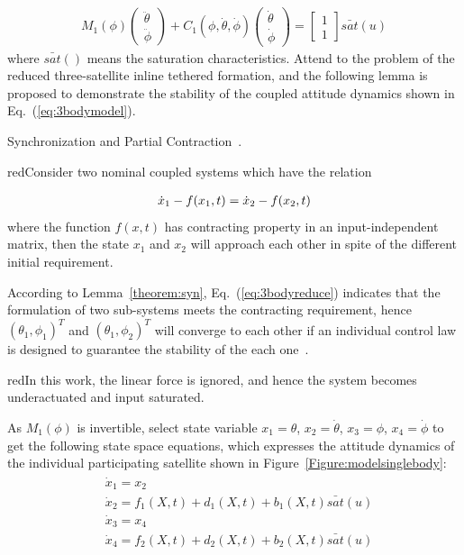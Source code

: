 \begin{align}
M_1(\phi)
\begin{pmatrix}
\ddot{\theta}\\
\ddot{\phi}
\end{pmatrix}
+C_1(\phi,\dot{\theta},\dot{\phi})
\begin{pmatrix}
\dot{\theta}\\
\dot{\phi}
\end{pmatrix}
=
\begin{bmatrix}
1\\
1
\end{bmatrix}\bar{sat}(u)\label{eq:individualsys}
\end{align}
where $\bar{sat}()$ means the saturation characteristics. Attend to the problem of the reduced three-satellite inline tethered formation, and the following lemma is proposed to demonstrate the stability of the coupled attitude dynamics shown in Eq.~(\ref{eq:3bodymodel}).
\begin{lemma}
Synchronization and Partial Contraction~\cite{wang2005partial}. \begin{color}{red}Consider two nominal coupled systems which have the relation\end{color}
\begin{align}
\dot{x}_1-f(x_1,t)=\dot{x}_2-f(x_2,t)\notag
\end{align}
where the function $f(x,t)$ has contracting property in an input-independent matrix, then the state $x_1$ and $x_2$ will approach each other in spite of the different initial requirement.\label{theorem:syn}
\end{lemma}\par
According to Lemma~\ref{theorem:syn}, Eq.~(\ref{eq:3bodyreduce}) indicates that the formulation of two sub-systems meets the contracting requirement, hence $(\theta_1,\phi_1)^T$ and $(\theta_1,\phi_2)^T$ will converge to each other if an individual control law is designed to guarantee the stability of the each one~\cite{huang2015nonlinear}.\par
\begin{color}{red}In this work, the linear force is ignored, and hence the system becomes underactuated and input saturated.\end{color}
As $M_1(\phi)$ is invertible, select state variable $x_1=\theta$, $x_2=\dot\theta$, $x_3=\phi$, $x_4=\dot\phi$ to get the following state space equations, which expresses the attitude dynamics of the individual participating satellite shown in Figure~\ref{Figure:modelsinglebody}:
\begin{align}
\begin{split}
&\dot x_1 = x_2\\
&\dot x_2 = f_1(X,t)+d_1(X,t)+b_1(X,t)\bar{sat}(u)\\
&\dot x_3 = x_4\\
&\dot x_4 = f_2(X,t)+d_2(X,t)+b_2(X,t)\bar{sat}(u)
\end{split}\label{eq:model}
\end{align}
